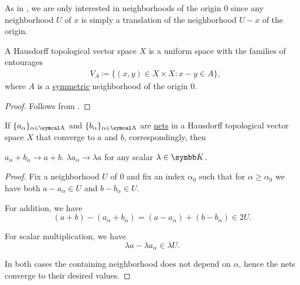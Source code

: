 \begin{remark}\label{remark:origin_neighborhoods_in_topological_vector_spaces}
  As in , we are only interested in neighborhoods of the origin \( 0 \) since any neighborhood \( U \) of \( x \) is simply a translation of the neighborhood \( U - x \) of the origin.
\end{remark}

\begin{proposition}\label{thm:topological_vector_space_is_uniform}
  A Hausdorff topological vector space \( X \) is a uniform space with the families of entourages
  \begin{align*}
    &V_A \coloneqq \{ (x, y) \in X \times X \colon x - y \in A \},
  \end{align*}
  where \( A \) is a \hyperref[def:neighborhood_set_types/symmetric]{symmetric} neighborhood of the origin \( 0 \).
\end{proposition}
\begin{proof}
  Follows from .
\end{proof}

\begin{proposition}\label{thm:linearity_of_sequence_limits}
  If \( \{ a_\alpha \}_{\alpha \in \CA} \) and \( \{ b_\alpha \}_{\alpha \in \CA} \) are \hyperref[def:topological_net]{nets} in a Hausdorff topological vector space \( X \) that converge to \( a \) and \( b \), correspondingly, then
  \begin{propenum}
     \( a_\alpha + b_\alpha \to a + b \).
     \( \lambda a_\alpha \to \lambda a \) for any scalar \( \lambda \in \BK \).
  \end{propenum}
\end{proposition}
\begin{proof}
  Fix a neighborhood \( U \) of \( 0 \) and fix an index \( \alpha_0 \) such that for \( \alpha \geq \alpha_0 \) we have both \( a - a_\alpha \in U \) and \( b - b_\alpha \in U \).

  \begin{description}
     For addition, we have
    \begin{equation*}
      (a + b) - (a_\alpha + b_\alpha) = (a - a_\alpha) + (b - b_\alpha) \in 2U.
    \end{equation*}

     For scalar multiplication, we have
    \begin{equation*}
      \lambda a - \lambda a_\alpha \in \lambda U.
    \end{equation*}
  \end{description}

  In both cases the containing neighborhood does not depend on \( \alpha \), hence the nets converge to their desired values.
\end{proof}

